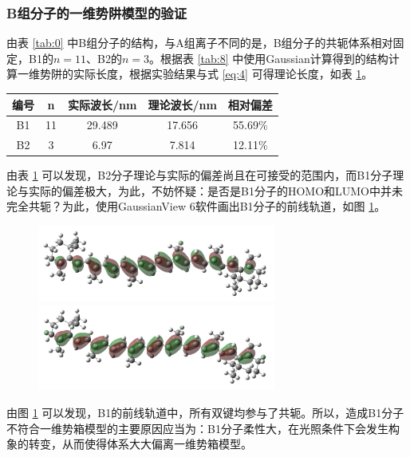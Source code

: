 \subsubsection{B组分子的一维势阱模型的验证}

由表 \ref{tab:0} 中B组分子的结构，与A组离子不同的是，B组分子的共轭体系相对固定，B1的$n=11$、B2的$n=3$。根据表 \ref{tab:8} 中使用Gaussian计算得到的结构计算一维势阱的实际长度，根据实验结果与式 \eqref{eq:4} 可得理论长度，如表 \ref{tab:11}。

\begin{table}[H]
    \centering
    \begin{tabular}{ccccc}
    \toprule
        编号 & n & 实际波长/\si{nm} & 理论波长/\si{nm} & 相对偏差\\
        \midrule
        B1 & 11 & 29.489 & 17.656 & 55.69\% \\
        B2 & 3 & 6.97 & 7.814 & 12.11\% \\
        \bottomrule
    \end{tabular}
    \label{tab:11}
\end{table}

由表 \ref{tab:11} 可以发现，B2分子理论与实际的偏差尚且在可接受的范围内，而B1分子理论与实际的偏差极大，为此，不妨怀疑：是否是B1分子的HOMO和LUMO中并未完全共轭？为此，使用GaussianView 6软件画出B1分子的前线轨道，如图 \ref{fig:14}。

\begin{figure}
    \centering
    \includegraphics[width=0.7\textwidth]{figures3/3-3-1.png}
    \includegraphics[width=0.7\textwidth]{figures3/3-3-2.png}
    \label{fig:14}
\end{figure}

由图 \ref{fig:14} 可以发现，B1的前线轨道中，所有双键均参与了共轭。所以，造成B1分子不符合一维势箱模型的主要原因应当为：B1分子柔性大，在光照条件下会发生构象的转变，从而使得体系大大偏离一维势箱模型。


















